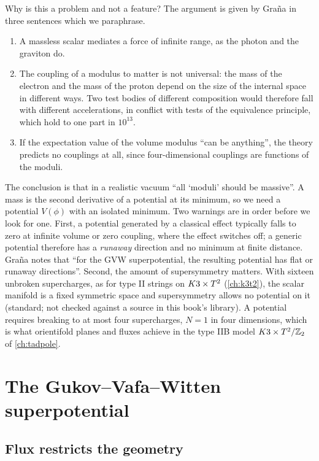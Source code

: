 Why is this a problem and not a feature? The argument is given by Gra\~na in three sentences
which we paraphrase. 
\begin{enumerate}[leftmargin=*,itemsep=1pt]
\item A massless scalar mediates a force of infinite range, as the photon and the graviton do.
\item The coupling of a modulus to matter is not universal: the mass of the electron and the
 mass of the proton depend on the size of the internal space in different ways. Two test
 bodies of different composition would therefore fall with different accelerations, in
 conflict with tests of the equivalence principle, which hold to one part in $10^{13}$.
\item If the expectation value of the volume modulus ``can be anything'', the theory predicts
 no couplings at all, since four-dimensional couplings are functions of the moduli.
\end{enumerate}
The conclusion is that in a realistic vacuum ``all `moduli' should be massive''. A mass is the
second derivative of a potential at its minimum, so we need a potential $V(\phi)$ with an
isolated minimum. Two warnings are in order before we look for one. First, a potential
generated by a classical effect typically falls to zero at infinite volume or zero coupling,
where the effect switches off; a generic potential therefore has a \emph{runaway} direction
and no minimum at finite distance. Gra\~na notes that ``for the GVW superpotential, the resulting
potential has flat or runaway directions''.  Second, the amount
of supersymmetry matters. With sixteen unbroken supercharges, as for type II strings on $K3\times T^2$
(\cref{ch:k3t2}), the scalar manifold is a fixed symmetric space and supersymmetry allows no
potential on it (standard; not checked against a source in this book's library). A potential
requires breaking to at most four supercharges, $N=1$ in four dimensions, which is what
orientifold planes and fluxes achieve in the type IIB model $K3\times T^2/\mathbb{Z}_2$ of \cref{ch:tadpole}.

\section{The Gukov--Vafa--Witten superpotential}\label{sec:stabilization:gvw}

\subsection{Flux restricts the geometry}

